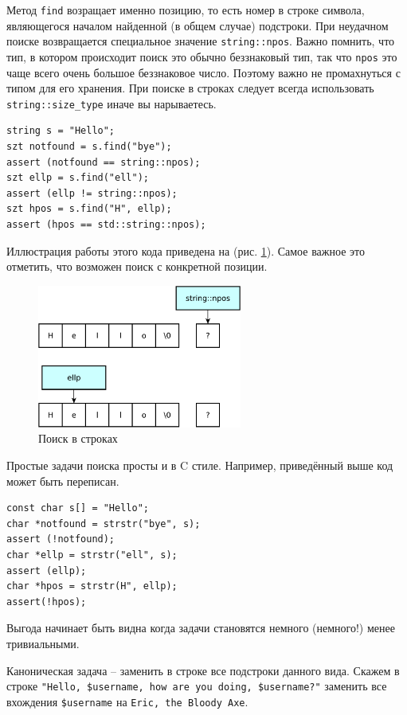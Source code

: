 \documentclass[a4paper,12pt,oneside]{article}
\begin{document}
Метод \lstinline!find! возращает именно позицию, то есть номер в строке символа, являющегося началом найденной (в общем случае) подстроки. При неудачном поиске возвращается специальное значение \lstinline!string::npos!. Важно помнить, что тип, в котором происходит поиск это обычно беззнаковый тип, так что \lstinline!npos! это чаще всего очень большое беззнаковое число. Поэтому важно не промахнуться с типом для его хранения. При поиске в строках следует всегда использовать \lstinline!string::size_type! иначе вы нарываетесь.

\begin{lstlisting}
string s = "Hello"; 
szt notfound = s.find("bye"); 
assert (notfound == string::npos); 
szt ellp = s.find("ell"); 
assert (ellp != string::npos); 
szt hpos = s.find("H", ellp); 
assert (hpos == std::string::npos);
\end{lstlisting}

Иллюстрация работы этого кода приведена на (рис. \ref{fig:string-find}). Самое важное это отметить, что возможен поиск с конкретной позиции. 

\begin{figure}[ht]
\centering
\includegraphics[width=0.6\textwidth]{illustrations/string-find-crop.pdf}
\caption{Поиск в строках}
\label{fig:string-find}
\end{figure}

Простые задачи поиска просты и в C стиле. Например, приведённый выше код может быть переписан.

\begin{lstlisting}
const char s[] = "Hello";
char *notfound = strstr("bye", s);
assert (!notfound);
char *ellp = strstr("ell", s);
assert (ellp);
char *hpos = strstr(H", ellp);
assert(!hpos); 
\end{lstlisting}

Выгода начинает быть видна когда задачи становятся немного (немного!) менее тривиальными.

Каноническая задача -- заменить в строке все подстроки данного вида. Скажем в строке \lstinline!"Hello, $username, how are you doing, $username?"! заменить все вхождения \lstinline!$username! на \lstinline!Eric, the Bloody Axe!.
\end{document}
